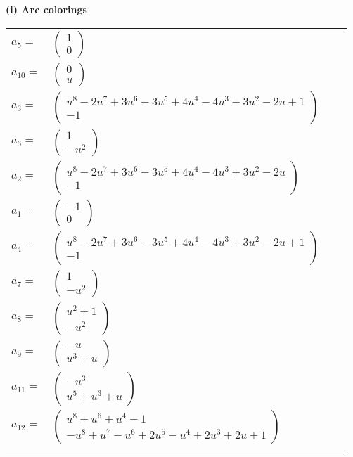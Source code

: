 \documentclass[1p]{elsarticle_modified}
\theoremstyle{definition}
\begin{document}
\flushleft \textbf{(i) Arc colorings}\\
\begin{tabular}{m{7pt} m{180pt} m{7pt} m{180pt} }
\flushright $a_{5}=$&$\begin{pmatrix}1\\0\end{pmatrix}$ \\
\flushright $a_{10}=$&$\begin{pmatrix}0\\u\end{pmatrix}$ \\
\flushright $a_{3}=$&$\begin{pmatrix}u^8-2 u^7+3 u^6-3 u^5+4 u^4-4 u^3+3 u^2-2 u+1\\-1\end{pmatrix}$ \\
\flushright $a_{6}=$&$\begin{pmatrix}1\\- u^2\end{pmatrix}$ \\
\flushright $a_{2}=$&$\begin{pmatrix}u^8-2 u^7+3 u^6-3 u^5+4 u^4-4 u^3+3 u^2-2 u\\-1\end{pmatrix}$ \\
\flushright $a_{1}=$&$\begin{pmatrix}-1\\0\end{pmatrix}$ \\
\flushright $a_{4}=$&$\begin{pmatrix}u^8-2 u^7+3 u^6-3 u^5+4 u^4-4 u^3+3 u^2-2 u+1\\-1\end{pmatrix}$ \\
\flushright $a_{7}=$&$\begin{pmatrix}1\\- u^2\end{pmatrix}$ \\
\flushright $a_{8}=$&$\begin{pmatrix}u^2+1\\- u^2\end{pmatrix}$ \\
\flushright $a_{9}=$&$\begin{pmatrix}- u\\u^3+u\end{pmatrix}$ \\
\flushright $a_{11}=$&$\begin{pmatrix}- u^3\\u^5+u^3+u\end{pmatrix}$ \\
\flushright $a_{12}=$&$\begin{pmatrix}u^8+u^6+u^4-1\\- u^8+u^7- u^6+2 u^5- u^4+2 u^3+2 u+1\end{pmatrix}$\\&\end{tabular}
\end{document}
